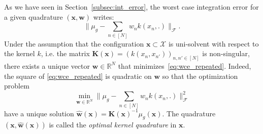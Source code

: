 \documentclass[twoside,11pt]{book}
\numberwithin{theorem}{chapter}
\numberwithin{definition}{chapter}
\numberwithin{proposition}{chapter}
\numberwithin{corollary}{chapter}
\numberwithin{example}{chapter}
\numberwithin{lemma}{chapter}
\numberwithin{assumption}{chapter}
\begin{document}
As we have seen in Section~\ref{subsec:int_error}, the worst case integration error for a given quadrature $(\bm{x}, \bm{w})$ writes:
\begin{equation}\label{eq:wce_repeated}
\bigg \|\mu_{g} - \sum\limits_{n \in [N]} w_{n}k(x_{n},.) \bigg\|_{\mathcal{F}}.
\end{equation}
Under the assumption that the configuration  $\bm{x} \subset \mathcal{X}$ is uni-solvent with respect to the kernel $k$, i.e. the matrix $\bm{K}(\bm{x}) = (k(x_{n},x_{n'}))_{n,n' \in [N]}$ is non-singular, there exists a unique vector $\bm{w} \in \mathbb{R}^{N}$ that minimizes~\eqref{eq:wce_repeated}. Indeed, the square of \eqref{eq:wce_repeated} is quadratic on $\bm{w}$ so that the optimization problem
\begin{equation}\label{eq:wce_repeated_optimization}
\min\limits_{\bm{w} \in \mathbb{R}^{N}} \bigg \|\mu_{g} - \sum\limits_{n \in [N]} w_{n}k(x_{n},.) \bigg\|_{\mathcal{F}}^{2}
\end{equation}
have a unique solution $\hat{\bm{w}}(\bm{x}) = \bm{K}(\bm{x})^{-1}\mu_{g}(\bm{x})$. The quadrature $(\bm{x},\hat{\bm{w}}(\bm{x}))$ is called the \emph{optimal kernel quadrature} in $\bm{x}$. 
\end{document}
